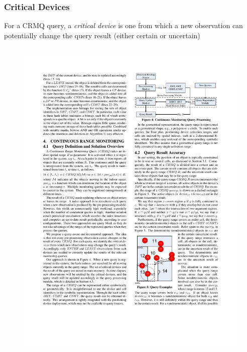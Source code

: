 \begin{frame}
\frametitle{Critical Devices}

For a \textrm{CRMQ} query, a \emph{critical device} is one from which a new observation can potentially change the query result (either certain or uncertain)
\begin{columns}[c]

    \begin{figure}[tb]
      \includegraphics[width=\columnwidth]{figures/2-2/2-2-5.pdf}
    \end{figure}


\end{columns}
\end{frame}

